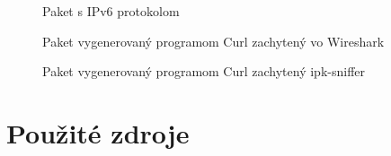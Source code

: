 \documentclass[11pt, a4paper]{article}
\begin{document}
	\begin{figure}[h]
	\centering
	\caption{Paket s IPv6 protokolom}
	
	\centering
	\caption{Paket vygenerovaný programom Curl zachytený vo Wireshark}
	
	\centering
	\caption{Paket vygenerovaný programom Curl zachytený ipk-sniffer}
	\end{figure}
	
	
	\newpage
	\section{Použité zdroje}
	
	
	\renewcommand{\refname}{Použitá literatúra}
	
	
	
\end{document}
